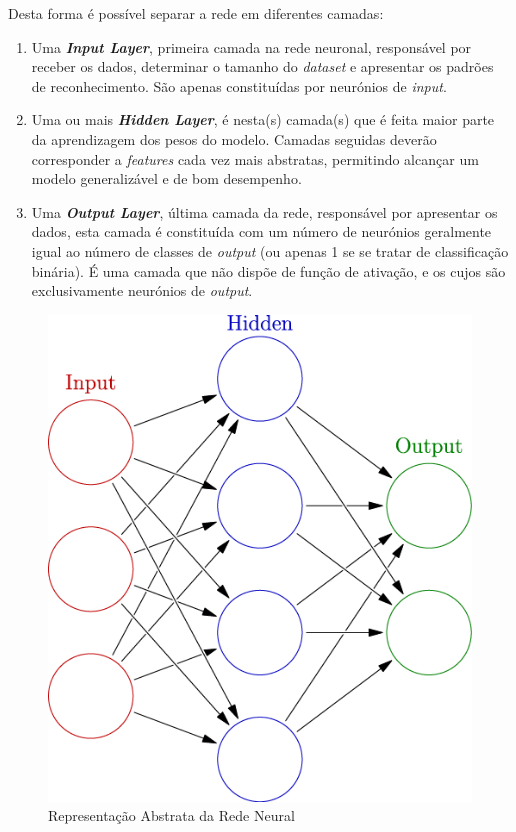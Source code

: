 \documentclass[]{article}
\begin{document}
Desta forma é possível separar a rede em diferentes camadas:
	\begin{enumerate}
		\item Uma \textbf{\textit{Input Layer}}, primeira camada na rede neuronal, responsável por receber os dados, determinar o tamanho do \textit{dataset} e apresentar os padrões de reconhecimento. São apenas constituídas por neurónios de \textit{input}.
		\item Uma ou mais \textbf{\textit{Hidden Layer}}, é nesta(s) camada(s) que é feita maior parte da aprendizagem dos pesos do modelo. Camadas seguidas deverão corresponder a \textit{features} cada vez mais abstratas, permitindo alcançar um modelo generalizável e de bom desempenho.
        \item Uma \textbf{\textit{Output Layer}}, última camada da rede, responsável por apresentar os dados, esta camada é constituída com um número de neurónios geralmente igual ao número de classes de \textit{output} (ou apenas 1 se se tratar de classificação binária). É uma camada que não dispõe de função de ativação, e os cujos são exclusivamente neurónios de \textit{output}.
	\end{enumerate}
    
    \begin{figure}[H]
    \centering
    \includegraphics[scale=.7]{img/neural_network.png}
    \caption{Representação Abstrata da Rede Neural}
    \end{figure}
    
\end{document}
